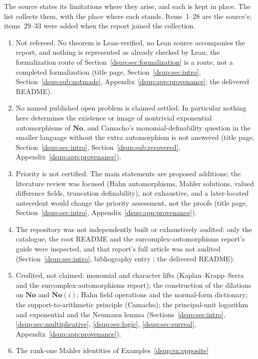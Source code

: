 \documentclass[11pt,oneside]{article}
\numberwithin{equation}{section}
\theoremstyle{definition}
\theoremstyle{remark}
\newcommand{\No}{\mathbf{No}}
\begin{document}
The source states its limitations where they arise, and each is kept in
place. The list collects them, with the place where each stands.
Items~1--28 are the source's; items~29--33 were added when the report
joined the collection.
\begin{enumerate}[label=\arabic*.,leftmargin=2.2em,itemsep=2pt]
\item Not refereed. No theorem is Lean-verified, no Lean source accompanies
the report, and nothing is represented as already checked by Lean; the
formalization route of Section~\ref{dsup:sec:formalization} is a route, not a
completed formalization (title page, Section~\ref{dsup:sec:intro},
Section~\ref{dsup:sub:notmade}, Appendix~\ref{dsup:app:provenance}; the
delivered README).
\item No named published open problem is claimed settled. In particular
nothing here determines the existence or image of nontrivial exponential
automorphisms of $\No$, and Camacho's monomial-definability question in the
smaller language without the extra automorphism is not answered (title
page, Section~\ref{dsup:sec:intro}, Section~\ref{dsup:sub:recovered},
Appendix~\ref{dsup:app:provenance}).
\item Priority is not certified. The main statements are proposed additions;
the literature review was focused (Hahn automorphisms, Mahler solutions,
valued difference fields, truncation definability), not exhaustive, and a
later-located antecedent would change the priority assessment, not the
proofs (title page, Section~\ref{dsup:sec:intro},
Appendix~\ref{dsup:app:provenance}).
\item The repository was not independently built or exhaustively audited:
only the catalogue, the root README and the surcomplex-automorphisms
report's guide were inspected, and that report's full article was not
audited (Section~\ref{dsup:sec:intro}, bibliography entry \cite{RepoAut}; the
delivered README).
\item Credited, not claimed: monomial and character lifts (Kaplan--Krapp--Serra
and the surcomplex-automorphisms report); the construction of the dilations
on $\No$ and $\No(i)$; Hahn field operations and the normal-form dictionary;
the support-to-arithmetic principle (Camacho); the principal-unit logarithm
and exponential and the Neumann lemma (Sections~\ref{dsup:sec:intro},
\ref{dsup:sec:multiplicative}, \ref{dsup:sec:logic}, \ref{dsup:sec:surreal},
Appendix~\ref{dsup:app:provenance}).
\item The rank-one Mahler identities of Examples~\ref{dsup:ex:opposite}

\end{enumerate}
\end{document}
